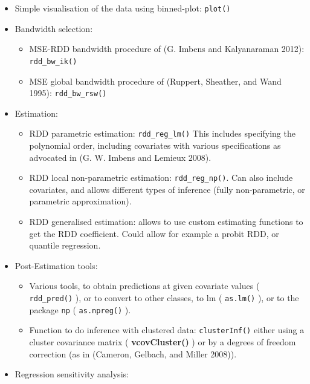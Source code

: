 \documentclass[article]{jss}
\begin{document}
\begin{itemize}
\itemsep1pt\parskip0pt
\item
  Simple visualisation of the data using binned-plot: \texttt{plot()}
\item
  Bandwidth selection:

  \begin{itemize}
  \itemsep1pt\parskip0pt
  \item
    MSE-RDD bandwidth procedure of (G. Imbens and Kalyanaraman 2012):
    \texttt{rdd\_bw\_ik()}
  \item
    MSE global bandwidth procedure of (Ruppert, Sheather, and Wand
    1995): \texttt{rdd\_bw\_rsw()}
  \end{itemize}
\item
  Estimation:

  \begin{itemize}
  \itemsep1pt\parskip0pt
  \item
    RDD parametric estimation: \texttt{rdd\_reg\_lm()} This includes
    specifying the polynomial order, including covariates with various
    specifications as advocated in (G. W. Imbens and Lemieux 2008).
  \item
    RDD local non-parametric estimation: \texttt{rdd\_reg\_np()}. Can
    also include covariates, and allows different types of inference
    (fully non-parametric, or parametric approximation).
  \item
    RDD generalised estimation: allows to use custom estimating
    functions to get the RDD coefficient. Could allow for example a
    probit RDD, or quantile regression.
  \end{itemize}
\item
  Post-Estimation tools:

  \begin{itemize}
  \itemsep1pt\parskip0pt
  \item
    Various tools, to obtain predictions at given covariate values (
    \texttt{rdd\_pred()} ), or to convert to other classes, to lm (
    \texttt{as.lm()} ), or to the package \texttt{np} (
    \texttt{as.npreg()} ).
  \item
    Function to do inference with clustered data: \texttt{clusterInf()}
    either using a cluster covariance matrix ( \textbf{vcovCluster()} )
    or by a degrees of freedom correction (as in (Cameron, Gelbach, and
    Miller 2008)).
  \end{itemize}
\item
  Regression sensitivity analysis:


\end{itemize}
\end{document}
